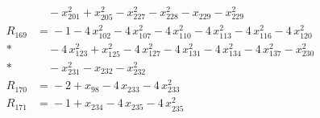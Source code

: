 \begin{align*}
&\quad{} -x_{201}^{2} +x_{205}^{2} -x_{227}^{2} -x_{228}^{2} -x_{229} -x_{229}^{2} \\[3pt]
R_{169} &={} -1 -4\,x_{102}^{2} -4\,x_{107}^{2} -4\,x_{110}^{2} -4\,x_{113}^{2} -4\,x_{116}^{2} -4\,x_{120}^{2} \\*
&\quad{} -4\,x_{123}^{2} +x_{125}^{2} -4\,x_{127}^{2} -4\,x_{131}^{2} -4\,x_{134}^{2} -4\,x_{137}^{2} -x_{230}^{2} \\*
&\quad{} -x_{231}^{2} -x_{232} -x_{232}^{2} \\[3pt]
R_{170} &={} -2 +x_{98} -4\,x_{233} -4\,x_{233}^{2} \\[3pt]
R_{171} &={} -1 +x_{234} -4\,x_{235} -4\,x_{235}^{2}
\end{align*}
\endgroup

